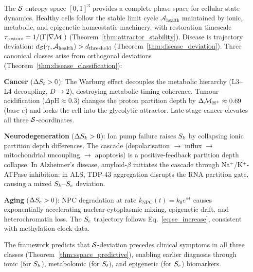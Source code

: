 \begin{chapterbox}
The $\mathcal{S}$-entropy space $[0,1]^3$ provides a complete phase space for
cellular state dynamics. Healthy cells follow the stable limit cycle
$\mathcal{A}_{\mathrm{health}}$ maintained by ionic, metabolic, and epigenetic
homeostatic machinery, with restoration timescale
$\tau_{\mathrm{restore}} = 1/(\Gamma|\nabla\mathcal{M}|)$
(Theorem~\ref{thm:attractor_stability}). Disease is trajectory deviation:
$d_{\mathcal{S}}(\gamma, \mathcal{A}_{\mathrm{health}}) > d_{\mathrm{threshold}}$
(Theorem~\ref{thm:disease_deviation}). Three canonical classes arise from
orthogonal deviations (Theorem~\ref{thm:disease_classification}):

\medskip
\noindent\textbf{Cancer} ($\Delta S_t > 0$): The Warburg effect decouples the
metabolic hierarchy (L3--L4 decoupling, $D \to 2$), destroying metabolic
timing coherence. Tumour acidification ($\Delta\mathrm{pH} \approx 0.3$) changes
the proton partition depth by $\Delta\Depth_{\ce{H+}} \approx 0.69$ (base-$e$)
and locks the cell into the glycolytic attractor. Late-stage cancer elevates
all three $\mathcal{S}$-coordinates.

\medskip
\noindent\textbf{Neurodegeneration} ($\Delta S_k > 0$): Ion pump failure raises
$S_k$ by collapsing ionic partition depth differences. The cascade
(depolarisation $\to$  influx $\to$ mitochondrial uncoupling
$\to$ apoptosis) is a positive-feedback partition depth collapse. In
Alzheimer's disease, amyloid-$\beta$ initiates the cascade through
Na$^+$/K$^+$-ATPase inhibition; in ALS, TDP-43 aggregation disrupts the
RNA partition gate, causing a mixed $S_k$--$S_e$ deviation.

\medskip
\noindent\textbf{Aging} ($\Delta S_e > 0$): NPC degradation at rate
$k_{\mathrm{NPC}}(t) = k_0 e^{\alpha t}$ causes exponentially accelerating
nuclear-cytoplasmic mixing, epigenetic drift, and heterochromatin loss.
The $S_e$ trajectory follows Eq.~\eqref{eq:se_increase}, consistent with
methylation clock data.

\medskip
The framework predicts that $\mathcal{S}$-deviation precedes clinical symptoms
in all three classes (Theorem~\ref{thm:sspace_predictive}), enabling
earlier diagnosis through ionic (for $S_k$), metabolomic (for $S_t$), and
epigenetic (for $S_e$) biomarkers.
\end{chapterbox}
